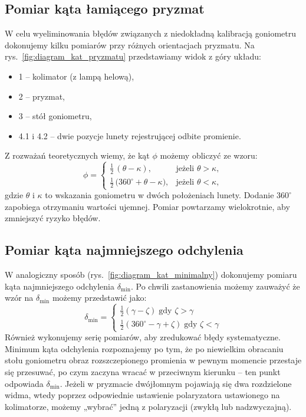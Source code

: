 \documentclass[12pt]{article}
\begin{document}
\subsection{Pomiar kąta łamiącego pryzmat}
W celu wyeliminowania błędów związanych z niedokładną kalibracją goniometru dokonujemy kilku pomiarów przy różnych orientacjach pryzmatu. Na rys.~\ref{fig:diagram_kat_pryzmatu} przedstawiamy widok z góry układu:  
\begin{itemize}[noitemsep]
    \item 1 – kolimator (z lampą helową),  
    \item 2 – pryzmat,  
    \item 3 – stół goniometru,  
    \item 4.1 i 4.2 – dwie pozycje lunety rejestrującej odbite promienie.
\end{itemize}
Z rozważań teoretycznych wiemy, że kąt $\phi$ możemy obliczyć ze wzoru:
\begin{equation}
    \phi = \begin{cases}
        \tfrac{1}{2}\,(\theta - \kappa), & \text{jeżeli } \theta > \kappa,\\
        \tfrac{1}{2}\,\bigl(360^\circ + \theta - \kappa\bigr), & \text{jeżeli } \theta < \kappa,
    \end{cases}
    \label{eq:lamiacy}
\end{equation}
gdzie $\theta$ i $\kappa$ to wskazania goniometru w dwóch położeniach lunety. Dodanie $360^\circ$ zapobiega otrzymaniu wartości ujemnej. Pomiar powtarzamy wielokrotnie, aby zmniejszyć ryzyko błędów.

\subsection{Pomiar kąta najmniejszego odchylenia}
W analogiczny sposób (rys.~\ref{fig:diagram_kat_minimalny}) dokonujemy pomiaru kąta najmniejszego odchylenia $\delta_{\mathrm{min}}$. Po chwili zastanowienia możemy zauważyć że wzór na $\delta_\mathrm{min}$ możemy przedstawić jako:
\begin{equation}
    \delta_\mathrm{min} = \begin{cases}
        \frac{1}{2}( \gamma - \zeta) \; \text{gdy }  \zeta > \gamma \\
        \frac{1}{2}(360^{\circ} - \gamma + \zeta) \; \text{gdy } \zeta < \gamma
    \end{cases}
    \label{eq:min}
\end{equation}
Również wykonujemy serię pomiarów, aby zredukować błędy systematyczne. 
Minimum kąta odchylenia rozpoznajemy po tym, że po niewielkim obracaniu stołu goniometru obraz rozszczepionego promienia w pewnym momencie przestaje się przesuwać, po czym zaczyna wracać w przeciwnym kierunku – ten punkt odpowiada $\delta_{\mathrm{min}}$.  
Jeżeli w pryzmacie dwójłomnym pojawiają się dwa rozdzielone widma, wtedy poprzez odpowiednie ustawienie polaryzatora ustawionego na kolimatorze, możemy „wybrać” jedną z polaryzacji (zwykłą lub nadzwyczajną).
\end{document}
